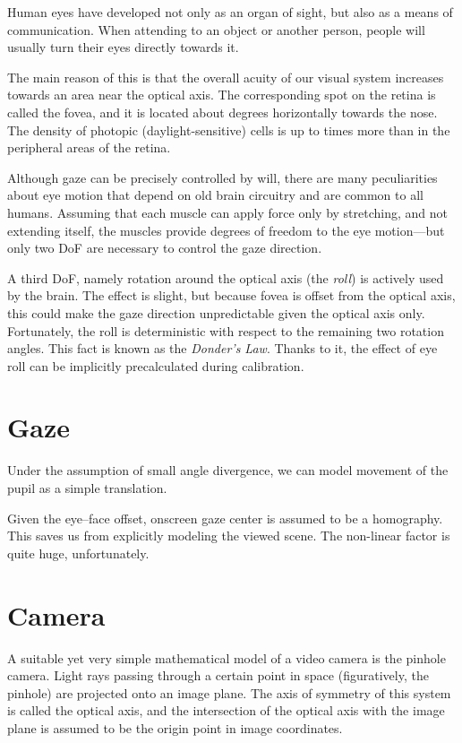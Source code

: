 Human eyes have developed not only as an organ of sight, but also as a means of communication.
When attending to an object or another person, people will usually turn their eyes directly towards it.

The main reason of this is that the overall acuity of our visual system increases towards an area near the optical axis.
The corresponding spot on the retina is called the fovea, and it is located about  degrees horizontally towards the nose.
The density of photopic (daylight-sensitive) cells is up to  times more than in the peripheral areas of the retina.

Although gaze can be precisely controlled by will, there are many peculiarities about eye motion that depend on old brain circuitry and are common to all humans.
Assuming that each muscle can apply force only by stretching, and not extending itself, the  muscles provide  degrees of freedom to the eye motion---but only two DoF are necessary to control the gaze direction.

A third DoF, namely rotation around the optical axis (the \textit{roll}) is actively used by the brain.
The effect is slight, but because fovea is offset from the optical axis, this could make the gaze direction unpredictable given the optical axis only.
Fortunately, the roll is deterministic with respect to the remaining two rotation angles.
This fact is known as the \textit{Donder's Law}.
Thanks to it, the effect of eye roll can be implicitly precalculated during calibration.


\section{Gaze}

Under the assumption of small angle divergence, we can model movement of the pupil as a simple translation.

Given the eye--face offset, onscreen gaze center is assumed to be a homography.
This saves us from explicitly modeling the viewed scene.
The non-linear factor is quite huge, unfortunately.

\section{Camera}

A suitable yet very simple mathematical model of a video camera is the pinhole camera.
Light rays passing through a certain point in space (figuratively, the pinhole) are projected onto an image plane.
The axis of symmetry of this system is called the optical axis, and the intersection of the optical axis with the image plane is assumed to be the origin point in image coordinates.

